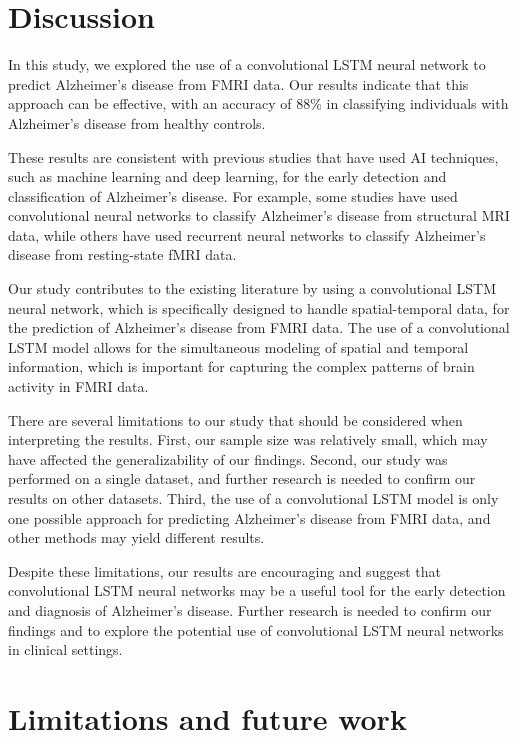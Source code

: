 \documentclass[10pt]{article}
\begin{document}
	\section{Discussion}

	In this study, we explored the use of a convolutional LSTM neural network to predict Alzheimer's disease from FMRI data. Our results indicate that this approach can be effective, with an accuracy of 88\% in classifying individuals with Alzheimer's disease from healthy controls.

	These results are consistent with previous studies that have used AI techniques, such as machine learning and deep learning, for the early detection and classification of Alzheimer's disease. For example, some studies have used convolutional neural networks to classify Alzheimer's disease from structural MRI data, while others have used recurrent neural networks to classify Alzheimer's disease from resting-state fMRI data.

	Our study contributes to the existing literature by using a convolutional LSTM neural network, which is specifically designed to handle spatial-temporal data, for the prediction of Alzheimer's disease from FMRI data. The use of a convolutional LSTM model allows for the simultaneous modeling of spatial and temporal information, which is important for capturing the complex patterns of brain activity in FMRI data.

	There are several limitations to our study that should be considered when interpreting the results. First, our sample size was relatively small, which may have affected the generalizability of our findings. Second, our study was performed on a single dataset, and further research is needed to confirm our results on other datasets. Third, the use of a convolutional LSTM model is only one possible approach for predicting Alzheimer's disease from FMRI data, and other methods may yield different results.

	Despite these limitations, our results are encouraging and suggest that convolutional LSTM neural networks may be a useful tool for the early detection and diagnosis of Alzheimer's disease. Further research is needed to confirm our findings and to explore the potential use of convolutional LSTM neural networks in clinical settings.

	\section{Limitations and future work}
\end{document}
